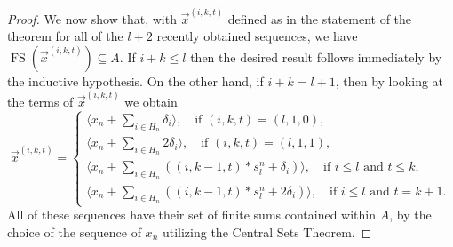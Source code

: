 \documentclass[10pt,a4paper]{amsart}
\newcommand{\fs}{\mathop{\mathrm{FS}}}
\begin{document}
\begin{proof}
We now show that, with $\vec{x}^{(i,k,t)}$ defined as in the statement of the theorem for all of the $l+2$ recently obtained sequences, we have $\fs(\vec{x}^{(i,k,t)})\subseteq A$. If $i+k\leq l$ then the desired result follows immediately by the inductive hypothesis. On the other hand, if $i+k=l+1$, then by looking at the terms of $\vec{x}^{(i,k,t)}$ we obtain 
\begin{equation*}
\vec{x}^{(i,k,t)}=\begin{cases}
\langle x_n+\sum_{i\in H_n}\delta_i\rangle,\ \ \ \text{ if }(i,k,t)=(l,1,0), \\
\langle x_n+\sum_{i\in H_n}2\delta_i\rangle,\ \ \ \text{ if }(i,k,t)=(l,1,1), \\
\langle x_n+\sum_{i\in H_n}\left((i,k-1,t)*s_l^n+\delta_i\right)\rangle,\ \ \ \text{ if }i\leq l\text{ and }t\leq k, \\
\langle x_n+\sum_{i\in H_n}\left((i,k-1,t)*s_l^n+2\delta_i\right)\rangle,\ \ \ \text{ if }i\leq l\text{ and }t=k+1.
\end{cases}
\end{equation*}
All of these sequences have their set of finite sums contained within $A$, by the choice of the sequence of $x_n$ utilizing the Central Sets Theorem.
\end{proof}
\end{document}
